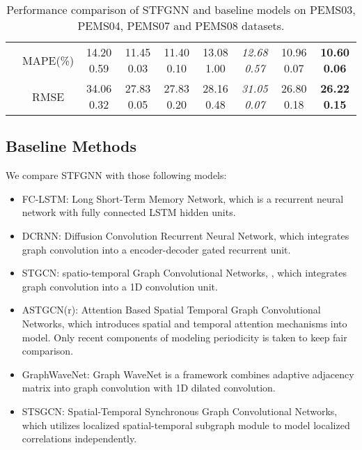 \documentclass[letterpaper]{article} \usepackage{aaai21}  \usepackage{times}  \usepackage{helvet} \usepackage{courier}  \usepackage[hyphens]{url}  \usepackage{graphicx} \urlstyle{rm} \def\UrlFont{\rm}  \usepackage{natbib}  \usepackage{caption} \frenchspacing  \setlength{\pdfpagewidth}{8.5in}  \setlength{\pdfpageheight}{11in}  \usepackage{multirow}
\begin{document}
\begin{table*}[!htb]
{\begin{tabular}{ccccccccc}
			\multicolumn{1}{c|}{}                        & \multicolumn{1}{c|}{MAPE(\%)}               & 14.20  0.59                    & 11.45  0.03                 & 11.40  0.10                  & 13.08  1.00                      & \textit{12.68  0.57}                & 10.96  0.07                   & \textbf{10.60 0.06}          \\ 
			\multicolumn{1}{c|}{}                        & \multicolumn{1}{c|}{RMSE}               & 34.06  0.32                   & 27.83  0.05                  & 27.83  0.20                  & 28.16  0.48                     & \textit{31.05  0.07}                & 26.80  0.18                   & \textbf{26.22 0.15}          \\ \hline
	\end{tabular}}
	\caption{Performance comparison of STFGNN and baseline models on PEMS03, PEMS04, PEMS07 and PEMS08 datasets.}
	\label{tab:pems03-08}
\end{table*}

\subsection{Baseline Methods}
We compare STFGNN with those following models:
\begin{itemize}


\item FC-LSTM: Long Short-Term Memory Network, which is a recurrent neural network with fully
connected LSTM hidden units\cite{sutskever2014sequence}.

\item DCRNN: Diffusion Convolution Recurrent Neural Network, which integrates graph convolution into a encoder-decoder gated recurrent unit\cite{li2017diffusion}.

\item STGCN: spatio-temporal Graph Convolutional
Networks, , which integrates graph convolution into a 1D convolution unit\cite{yu2017spatio}.

\item ASTGCN(r): Attention Based Spatial Temporal Graph Convolutional Networks, which introduces spatial and temporal attention mechanisms into model. Only recent components of modeling periodicity is taken to keep fair comparison\cite{guo2019attention}.

\item GraphWaveNet: Graph WaveNet is a framework combines adaptive adjacency matrix into graph convolution with 1D dilated convolution\cite{wu2019graph}.

\item STSGCN: Spatial-Temporal Synchronous Graph Convolutional Networks, which utilizes localized spatial-temporal subgraph module to model localized correlations independently\cite{song2020spatial}.

\end{itemize}
\end{document}
